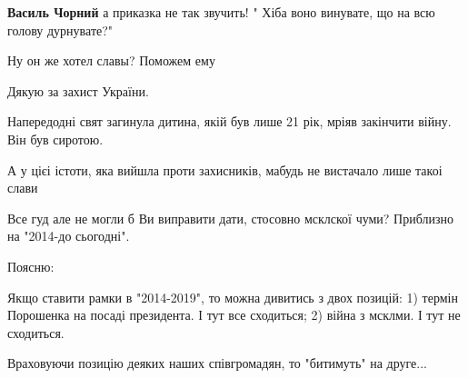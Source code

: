 \begin{itemize}
\begin{itemize}
\textbf{Василь Чорний} а приказка не так звучить! " Хіба воно винувате, що на всю голову дурнувате?"
\end{itemize}

 
Ну он же хотел славы? Поможем ему

 
Дякую за захист України.

 

Напередодні свят загинула дитина, якій був лише 21 рік, мріяв закінчити війну.
Він був сиротою.

А у цієі істоти, яка вийшла проти захисників, мабудь не вистачало лише такоі
слави


 

Все гуд але не могли б Ви виправити дати, стосовно мсклскої чуми? Приблизно на
"2014-до сьогодні".

Поясню:

Якщо ставити рамки в "2014-2019", то можна дивитись з двох позицій: 1) термін
Порошенка на посаді президента. І тут все сходиться; 2) війна з мсклми. І тут
не сходиться.

Враховуючи позицію деяких наших співгромадян, то "битимуть" на друге...

\end{itemize}

